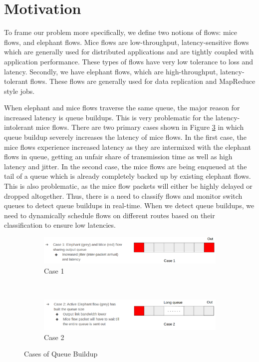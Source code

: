 \section{Motivation}
To frame our problem more specifically, we define two notions of flows: mice flows, and elephant flows. Mice flows are low-throughput, latency-sensitive flows which are generally used for distributed applications and are tightly coupled with application performance. These types of flows have very low tolerance to loss and latency. Secondly, we have elephant flows, which are high-throughput, latency-tolerant flows. These flows are generally used for data replication and MapReduce style jobs. 

When elephant and mice flows traverse the same queue, the major reason for increased latency is queue buildups. This is very problematic for the latency-intolerant mice flows. There are two primary cases shown in Figure \ref{fig:cases} in which queue buildup severely increases the latency of mice flows. In the first case, the mice flows experience increased latency as they are intermixed with the elephant flows in queue, getting an unfair share of transmission time as well as high latency and jitter. In the second case, the mice flows are being enqueued at the tail of a queue which is already completely backed up by existing elephant flows. This is also problematic, as the mice flow packets will either be highly delayed or dropped altogether. Thus, there is a need to classify flows and monitor switch queues to detect queue buildups in real-time. When we detect queue buildups, we need to dynamically schedule flows on different routes based on their classification to ensure low latencies. 

\begin{figure}[H]
\centering
\begin{subfigure}{.55\textwidth}
  \centering
  \includegraphics[width=.8\linewidth]{case1}
  \caption{Case 1}
  \label{fig:case1}
\end{subfigure}%
\\
\begin{subfigure}{.55\textwidth}
  \centering
  \includegraphics[width=.8\linewidth]{case2}
  \caption{Case 2 }
  \label{fig:case2}
\end{subfigure}
\caption{Cases of Queue Buildup}
\label{fig:cases}
\end{figure}

